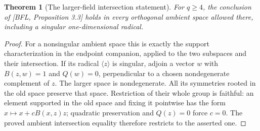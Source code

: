 \documentclass[11pt,a4paper]{article}
\newtheorem{theorem}{Theorem}
\newcommand{\gen}[1]{\langle#1\rangle}
\begin{document}
\begin{theorem}[The larger-field intersection statement]
For $q\geq4$, the conclusion of [BFL, Proposition 3.3] holds in
every orthogonal ambient space allowed there, including a singular
one-dimensional radical.
\end{theorem}
\begin{proof}
For a nonsingular ambient space this is exactly the support
characterization in the endpoint companion, applied to the two
subspaces and their intersection. If its radical $\gen z$ is singular,
adjoin a vector $w$ with $B(z,w)=1$ and $Q(w)=0$, perpendicular
to a chosen nondegenerate complement of $z$. The larger space
is nondegenerate. All its symmetries rooted in the old space
preserve that space. Restriction of their whole group is faithful:
an element supported in the old space and fixing it pointwise has
the form $x\mapsto x+cB(x,z)z$; quadratic preservation and
$Q(z)=0$ force $c=0$. The proved ambient intersection equality
therefore restricts to the asserted one.
\end{proof}
\end{document}

